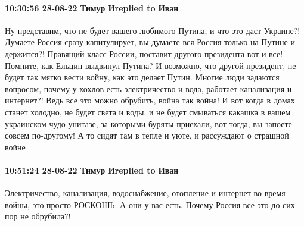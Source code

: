  
 
 
 
 

\paragraph{10:30:56 28-08-22 Тимур Иreplied to Иван}

Ну представим, что не будет вашего любимого Путина, и что это даст Украине?!
Думаете Россия сразу капитулирует, вы думаете вся Россия только на Путине и
держится?! Правящий класс России, поставит другого президента вот и все!
Помните, как Ельцин выдвинул Путина? И возможно, что другой президент, не будет
так мягко вести войну, как это делает Путин. Многие люди задаются вопросом,
почему у хохлов есть электричество и вода, работает канализация и интернет?!
Ведь все это можно обрубить, война так война! И вот когда в домах станет
холодно, не будет света и воды, и не будет смываться какашка в вашем украинском
чудо-унитазе, за которыми буряты приехали, вот тогда, вы запоете совсем
по-другому! А то сидят там в тепле и уюте, и рассуждают о страшной войне

\paragraph{10:51:24 28-08-22 Тимур Иreplied to Иван}

Электричество, канализация, водоснабжение, отопление и интернет во время войны,
это просто РОСКОШЬ. А они у вас есть. Почему Россия все это до сих пор не
обрубила?!

